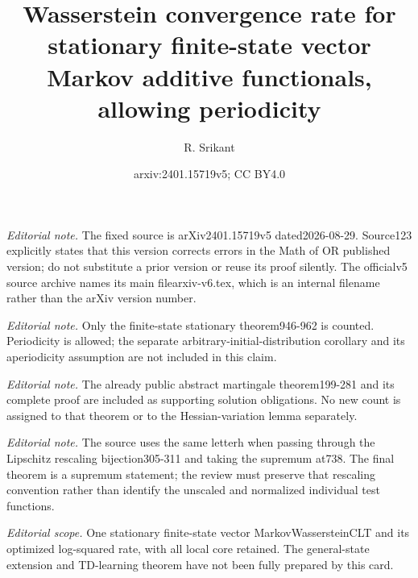 \documentclass[10pt,a4paper]{article}
\title{Wasserstein convergence rate for stationary finite-state vector Markov additive functionals, allowing periodicity}
\author{R. Srikant}
\date{arxiv:2401.15719v5; CC BY4.0}
\begin{document}
\maketitle
\noindent\textit{Editorial note.} The fixed source is arXiv2401.15719v5 dated2026-08-29. Source123 explicitly states that this version corrects errors in the Math of OR published version; do not substitute a prior version or reuse its proof silently. The officialv5 source archive names its main filearxiv-v6.tex, which is an internal filename rather than the arXiv version number.\par\medskip
\noindent\textit{Editorial note.} Only the finite-state stationary theorem946-962 is counted. Periodicity is allowed; the separate arbitrary-initial-distribution corollary and its aperiodicity assumption are not included in this claim.\par\medskip
\noindent\textit{Editorial note.} The already public abstract martingale theorem199-281 and its complete proof are included as supporting solution obligations. No new count is assigned to that theorem or to the Hessian-variation lemma separately.\par\medskip
\noindent\textit{Editorial note.} The source uses the same letterh when passing through the Lipschitz rescaling bijection305-311 and taking the supremum at738. The final theorem is a supremum statement; the review must preserve that rescaling convention rather than identify the unscaled and normalized individual test functions.\par\medskip
\noindent\textit{Editorial scope.} One stationary finite-state vector MarkovWassersteinCLT and its optimized log-squared rate, with all local core retained. The general-state extension and TD-learning theorem have not been fully prepared by this card.\par\medskip
\end{document}
